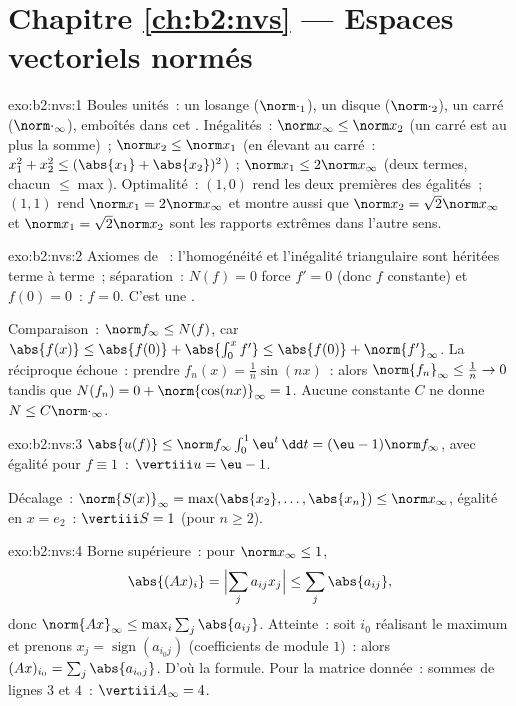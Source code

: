 \section*{Chapitre \ref{ch:b2:nvs} --- Espaces vectoriels normés}

\begin{solution}{exo:b2:nvs:1}
Boules unités~: un losange ($\norm\cdot_1$), un disque ($\norm\cdot_2$),
un carré ($\norm\cdot_\infty$), emboîtés dans cet . Inégalités~:
$\norm x_\infty \leq \norm x_2$ (un carré est au plus la somme)~;
$\norm x_2 \leq \norm x_1$ (en élevant au carré~: $x_1^2 + x_2^2 \leq (\abs{x_1}
+ \abs{x_2})^2$)~; $\norm x_1 \leq 2\norm x_\infty$ (deux termes, chacun
$\leq \max$). Optimalité~: $(1, 0)$ rend les deux premières des égalités~;
$(1, 1)$ rend $\norm x_1 = 2\norm x_\infty$ et montre aussi que
$\norm x_2 = \sqrt2 \norm x_\infty$ et $\norm x_1 = \sqrt2 \norm
x_2$ sont les rapports extrêmes dans l'autre sens.
\end{solution}

\begin{solution}{exo:b2:nvs:2}
Axiomes de ~: l'homogénéité et l'inégalité triangulaire sont héritées
terme à terme~; séparation~: $N(f) = 0$ force $f' = 0$ (donc $f$ constante)
et $f(0) = 0$~: $f = 0$. C'est une .

Comparaison~: $\norm f_\infty \leq N(f)$, car $\abs{f(x)} \leq
\abs{f(0)} + \abs{\int_0^x f'} \leq \abs{f(0)} +
\norm{f'}_\infty$. La réciproque échoue~: prendre $f_n(x) = \frac1n
\sin(nx)$~: alors $\norm{f_n}_\infty \leq \frac1n \to 0$ tandis que
$N(f_n) = 0 + \norm{\cos(nx)}_\infty = 1$. Aucune constante $C$ ne donne
$N \leq C\norm\cdot_\infty$.
\end{solution}

\begin{solution}{exo:b2:nvs:3}
$\abs{u(f)} \leq \norm f_\infty \int_0^1 \eu^t\,\dd t = (\eu -
1)\norm f_\infty$, avec égalité pour $f \equiv 1$~: $\vertiii u =
\eu - 1$.

Décalage~: $\norm{S(x)}_\infty = \max(\abs{x_2}, \dots, \abs{x_n}) \leq
\norm x_\infty$, égalité en $x = e_2$~: $\vertiii S = 1$ (pour $n
\geq 2$).
\end{solution}

\begin{solution}{exo:b2:nvs:4}
Borne supérieure~: pour $\norm x_\infty \leq 1$,
\[
\abs{(Ax)_i} = \Bigl|\sum_j a_{ij}x_j\Bigr| \leq \sum_j
\abs{a_{ij}},
\]
donc $\norm{Ax}_\infty \leq \max_i \sum_j \abs{a_{ij}}$. Atteinte~: soit
$i_0$ réalisant le maximum et prenons $x_j = \operatorname{sign}(a_{i_0
j})$ (coefficients de module $1$)~: alors $(Ax)_{i_0} = \sum_j \abs{a_{i_0
j}}$. D'où la formule. Pour la matrice donnée~: sommes de lignes $3$ et
$4$~: $\vertiii A_\infty = 4$.
\end{solution}

